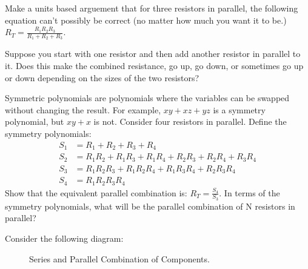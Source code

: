 \begin{blevel}
Make a units based arguement that for three resistors in parallel, the following equation can't possibly be correct (no matter how much you want it to be.) $R_T=\frac{R_1 R_2 R_3}{R_1+R_2+R_3}$.
\end{blevel}

\begin{blevel}
Suppose you start with one resistor and then add another resistor in parallel to it. Does this make the combined resistance, go up, go down, or sometimes go up or down depending on the sizes of the two resistors?
\end{blevel}

\begin{dlevel}
Symmetric polynomials are polynomials where the variables can be swapped without changing the result. For example, $xy+xz+yz$ is a symmetry polynomial, but $xy+x$ is not. Consider four resistors in parallel. Define the symmetry polynomials:
\begin{align*}
S_1&=R_1+R_2+R_3+R_4 \\
S_2&=R_1R_2+R_1R_3+R_1R_4+R_2R_3+R_2R_4+R_3R_4\\
S_3&=R_1R_2R_3+R_1R_2R_4+R_1R_3R_4+R_2R_3R_4\\
S_4&=R_1R_2R_3R_4
\end{align*}
Show that the equivalent parallel combination is: $R_T = \frac{S_4}{S_3}$. In terms of the symmetry polynomials, what will be the parallel combination of N resistors in parallel?
\end{dlevel}

Consider the following diagram:

\begin{figure}[H]
\begin{center}
\caption{Series and Parallel Combination of Components.}
\label{F:SP3}
\end{center}
\end{figure}

